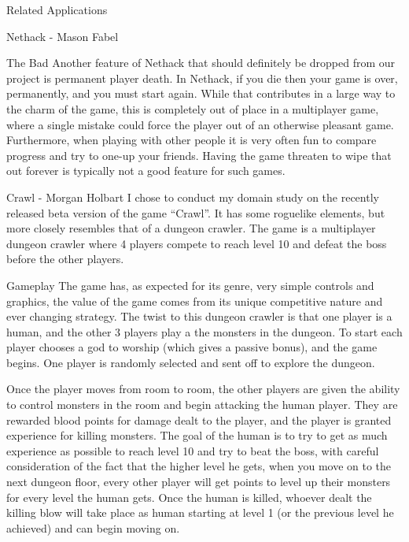 \documentclass[12pt]{report}
\begin{document}
\begin{section}{Related Applications}
\begin{subsection}{Nethack - Mason Fabel}
\begin{subsubsection}{The Bad}
Another feature of Nethack that should definitely be dropped from our
project is permanent player death. In Nethack, if you die then your game is
over, permanently, and you must start again. While that contributes in a
large way to the charm of the game, this is completely out of place in a
multiplayer game, where a single mistake could force the player out of an
otherwise pleasant game. Furthermore, when playing with other people it
is very often fun to compare progress and try to one-up your friends.
Having the game threaten to wipe that out forever is typically not a good
feature for such games.
\end{subsubsection}

\end{subsection}

\begin{subsection}{Crawl - Morgan Holbart}
I chose to conduct my domain study on the recently released beta version
of the game ``Crawl''. It has some roguelike elements, but more closely
resembles that of a dungeon crawler. The game is a multiplayer dungeon
crawler where 4 players compete to reach level 10 and defeat the boss
before the other players. 

\begin{subsubsection}{Gameplay}
The game has, as expected for its genre, very simple controls and graphics,
the value of the game comes from its unique competitive nature and ever
changing strategy. The twist to this dungeon crawler is that one player
is a human, and the other 3 players play a the monsters in the dungeon. To
start each player chooses a god to worship (which gives a passive bonus),
and the game begins. One player is randomly selected and sent off to
explore the dungeon.

Once the player moves from room to room, the other players are given the
ability to control monsters in the room and begin attacking the human
player. They are rewarded blood points for damage dealt to the player, and
the player is granted experience for killing monsters. The goal of the
human is to try to get as much experience as possible to reach level 10
and try to beat the boss, with careful consideration of the fact that the
higher level he gets, when you move on to the next dungeon floor, every
other player will get points to level up their monsters for every level
the human gets. Once the human is killed, whoever dealt the killing blow
will take place as human starting at level 1 (or the previous level he
achieved) and can begin moving on.


\end{subsubsection}
\end{subsection}
\end{section}
\end{document}
